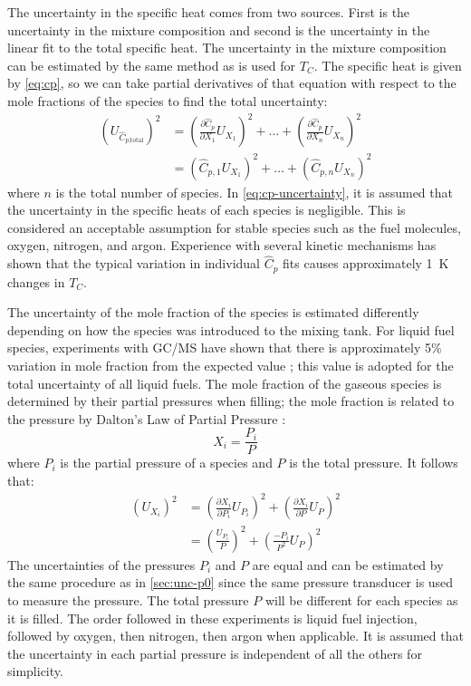 \documentclass[../main.tex]{subfiles}
\begin{document}
The uncertainty in the specific heat comes from two sources. First is the
uncertainty in the mixture composition and second is the uncertainty in
the linear fit to the total specific heat. The uncertainty in the mixture
composition can be estimated by the same method as is used for $T_C$. The
specific heat is given by \cref{eq:cp}, so we can take partial derivatives
of that equation with respect to the mole fractions of the species to find
the total uncertainty:
%
\begin{equation}
\label{eq:cp-uncertainty}
\begin{split}
\left(U_{\hat{C}_{p\text{,total}}}\right)^2 &= \left(\frac{\partial \hat{C}_p}{\partial X_1} U_{X_1}\right)^2 + \ldots + \left(\frac{\partial \hat{C}_p}{\partial X_n} U_{X_n}\right)^2 \\
&= \left(\hat{C}_{p,1} U_{X_1}\right)^2 + \ldots + \left(\hat{C}_{p,n} U_{X_n}\right)^2
\end{split}
\end{equation}
%
where $n$ is the total number of species. In \cref{eq:cp-uncertainty},
it is assumed that the uncertainty in the specific heats of each species
is negligible. This is considered an acceptable assumption for stable species
such as the fuel molecules, oxygen, nitrogen, and argon. Experience with
several kinetic mechanisms has shown that the typical variation in individual
$\hat{C}_p$ fits causes approximately \SI{1}{\kelvin} changes in $T_C$.

The uncertainty of the mole fraction of the species is estimated differently
depending on how the species was introduced to the mixing tank. For liquid fuel
species, experiments with GC/MS have shown that there is approximately 5\%
variation in mole fraction from the expected value \cite{Weber2011}; this value is adopted for
the total uncertainty of all liquid fuels. The mole fraction of the gaseous species
is determined by their partial pressures when filling; the mole fraction is
related to the pressure by Dalton's Law of Partial Pressure
\cite{Dalton1801,Gillespie1930}:
%
\begin{equation}
X_i = \frac{P_i}{P}
\end{equation}
%
where $P_i$ is the partial pressure of a species and $P$ is the total pressure.
It follows that:
%
\begin{equation}
\begin{split}
\left(U_{X_i}\right)^2 &= \left(\frac{\partial X_i}{\partial P_i} U_{P_i}\right)^2 + \left(\frac{\partial X_i}{\partial P} U_P\right)^2 \\
&= \left(\frac{U_{P_i}}{P}\right)^2 + \left(\frac{{-P_i}}{P^2} U_P\right)^2
\end{split}
\end{equation}
%
The uncertainties of the pressures $P_i$ and $P$ are equal and can be estimated by
the same procedure as in \cref{sec:unc-p0} since the same pressure transducer
is used to measure the pressure. The total pressure $P$ will be different for
each species as it is filled. The order followed in these experiments is
liquid fuel injection, followed by oxygen, then nitrogen, then argon when
applicable. It is assumed that the uncertainty in each partial pressure
is independent of all the others for simplicity.
\end{document}
